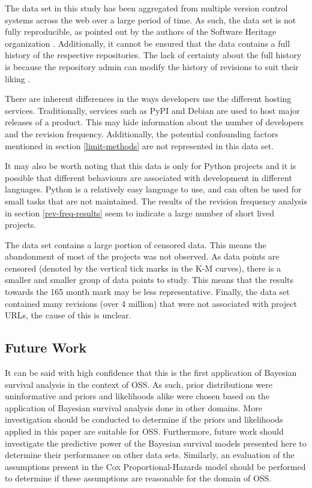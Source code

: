 \documentclass[sigconf]{acmart}
\begin{document}
The data set in this study has been aggregated from multiple version control systems across the web over a large period of time.
As such, the data set is not fully reproducible, as pointed out by the authors of the Software Heritage organization \cite{pietri2019software}.
Additionally, it cannot be ensured that the data contains a full history of the respective repositories.
The lack of certainty about the full history is because the repository admin can modify the history of revisions to suit their liking \cite{perils2009}.

There are inherent differences in the ways developers use the different hosting services.
Traditionally, services such as PyPI and Debian are used to host major releases of a product.
This may hide information about the number of developers and the revision frequency.
Additionally, the potential confounding factors mentioned in section \ref{limit-methods} are not represented in this data set.

It may also be worth noting that this data is only for Python projects and it is possible that different behaviours are associated with development in different languages.
Python is a relatively easy language to use, and can often be used for small tasks that are not maintained.
The results of the revision frequency analysis in section \ref{rev-freq-results} seem to indicate a large number of short lived projects.

The data set contains a large portion of censored data.
This means the abandonment of most of the projects was not observed.
As data points are censored (denoted by the vertical tick marks in the K-M curves), there is a smaller and smaller group of data points to study.
This means that the results towards the 165 month mark may be less representative. Finally, the data set contained many revisions (over 4 million) that were not associated with project URLs, the cause of this is unclear.

\subsection{Future Work} \label{future}

It can be said with high confidence that this is the first application of Bayesian survival analysis in the context of OSS. 
As such, prior distributions were uninformative and priors and likelihoods alike were chosen based on the application of Bayesian survival analysis done in other domains. 
More investigation should be conducted to determine if the priors and likelihoods applied in this paper are suitable for OSS. 
Furthermore, future work should investigate the predictive power of the Bayesian survival models presented here to determine their performance on other data sets. 
Similarly, an evaluation of the assumptions present in the Cox Proportional-Hazards model should be performed to determine if these assumptions are reasonable for the domain of OSS.
\end{document}
